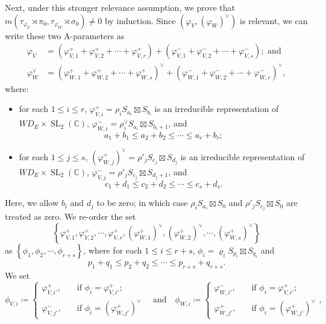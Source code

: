 \documentclass[11pt,letterpaper]{amsart}
\theoremstyle{plain}
\numberwithin{theorem}{section}
\numberwithin{equation}{subsection}
\theoremstyle{remark}
\newcommand{\SL}{\operatorname{SL}}
\newcommand{\C}{\mathbb{C}}
\begin{document}
Next, under this stronger relevance assumption, we prove that $m\left(\tau_{\varphi_V}\rtimes\pi_0, \tau_{\varphi_W}\rtimes \sigma_0\right)\neq 0$ by induction. Since $\left(\varphi_V, \left(\varphi_W\right)^\vee\right)$ is relevant, we can write these two A-parameters as
\begin{align*}
    \varphi_V &= \left(\varphi^+_{V,1} + \varphi^+_{V,2} + \cdots + \varphi^+_{V,r}\right) + \left(\varphi^-_{V,1} + \varphi^-_{V,2} + \cdots + \varphi^-_{V,s}\right); \text{ and}\\
    \varphi^\vee_W &= \left(\varphi^+_{W,1} + \varphi^+_{W,2} + \cdots + \varphi^+_{W,s}\right)^\vee + \left(\varphi^-_{W,1} + \varphi^-_{W,2} + \cdots + \varphi^-_{W,r}\right)^\vee,
\end{align*}
where:
\begin{itemize}
    \item for each $1\leq i\leq r$, $\varphi^+_{V,i} = \rho_i S_{a_i}\boxtimes S_{b_i}$ is an irreducible representation of $WD_E\times \SL_2(\C)$, $\varphi^-_{W,i} = \rho^\vee_i S_{a_i}\boxtimes S_{b_i+1}$, and 
    \[
        a_1+b_1\leq a_2+b_2\leq \cdots\leq a_r+b_r;
    \]

    \vskip 5pt

    \item for each $1\leq j\leq s$, $\left(\varphi^+_{W,j}\right)^\vee = \rho'_j S_{c_j}\boxtimes S_{d_j}$ is an irreducible representation of $WD_E\times \SL_2(\C)$, $\varphi^-_{V,j} = \rho'_j S_{c_j}\boxtimes S_{d_j+1}$, and 
    \[
        c_1+d_1\leq c_2+d_2\leq \cdots\leq c_s+d_s.
    \]
\end{itemize}
\vskip 5pt
Here, we allow $b_i$ and $d_j$ to be zero; in which case $\rho_i S_{a_i}\boxtimes S_{0}$ and $\rho'_j S_{c_j}\boxtimes S_{0}$ are treated as zero. We re-order the set
\[
    \left\{\varphi^+_{V,1}, \varphi^+_{V,2}, \cdots, \varphi^+_{V,r}, \left(\varphi^+_{W,1}\right)^\vee, \left(\varphi^+_{W,2}\right)^\vee, \cdots, \left(\varphi^+_{W,s}\right)^\vee\right\}
\]
as $\left\{\phi_1,\phi_2,\cdots,\phi_{r+s}\right\}$, where for each $1\leq i\leq r+s$, $\phi_i = \varrho_i S_{p_i}\boxtimes S_{q_i}$ and
\[
    p_1+q_1\leq p_2+q_2 \leq \cdots\leq p_{r+s}+q_{r+s}.
\]
We set
\[
    \phi_{V,i} \coloneqq \begin{cases}
      \varphi^+_{V,i'}, \quad &\text{if }\phi_i= \varphi^+_{V,i'};\\
      \varphi^-_{V,j'}, \quad &\text{if }\phi_i= \left(\varphi^+_{W,j'}\right)^\vee  
    \end{cases}
    \quad\text{and}\quad
    \phi_{W,i} \coloneqq \begin{cases}
      \varphi^-_{W,i'}, \quad &\text{if }\phi_i= \varphi^+_{V,i'};\\
      \varphi^+_{W,j'}, \quad &\text{if }\phi_i= \left(\varphi^+_{W,j'}\right)^\vee  
    \end{cases},
\]
\end{document}
